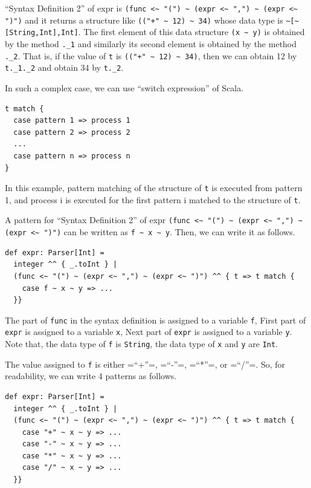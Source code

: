 \documentclass[11pt]{article}
\begin{document}
``Syntax Definition 2'' of expr is \texttt{(func <\textasciitilde{} "(") \textasciitilde{} (expr <\textasciitilde{} ",") \textasciitilde{} (expr <\textasciitilde{} ")")} 
and it returns a structure like \texttt{(("+" \textasciitilde{} 12) \textasciitilde{} 34)} whose data type is \texttt{\textasciitilde{}[\textasciitilde{}[String,Int],Int]}.
The first element of this data structure  \texttt{(x \textasciitilde{} y)} is obtained by the
method  \texttt{.\_1} and similarly its second element is obtained by the method
\texttt{.\_2}. That is, if the value of \texttt{t} is \texttt{(("+" \textasciitilde{} 12) \textasciitilde{} 34)}, 
then we can obtain 12 by  \texttt{t.\_1.\_2} and obtain 34 by \texttt{t.\_2}.

In such a complex case, we can use ``switch expression'' of Scala.
\begin{verbatim}
t match {
  case pattern 1 => process 1
  case pattern 2 => process 2
  ...
  case pattern n => process n
}
\end{verbatim}

In this example, pattern matching of the structure of \texttt{t} is executed
from pattern 1, and process i is executed for the first pattern i
matched to the structure of \texttt{t}. 

A pattern for ``Syntax Definition 2'' of expr \texttt{(func <\textasciitilde{} "(") \textasciitilde{} (expr <\textasciitilde{}
",") \textasciitilde{} (expr <\textasciitilde{} ")")} can be written as \texttt{f \textasciitilde{} x \textasciitilde{} y}. 
Then, we can write it as follows.
\begin{verbatim}
def expr: Parser[Int] =
  integer ^^ { _.toInt } |
  (func <~ "(") ~ (expr <~ ",") ~ (expr <~ ")") ^^ { t => t match {
    case f ~ x ~ y => ...
  }}
\end{verbatim}

The part of \texttt{func} in the syntax definition is assigned to a variable \texttt{f}, 
First part of \texttt{expr} is assigned to a variable \texttt{x}, 
Next part of \texttt{expr} is assigned to a variable \texttt{y}. 
Note that, the data type of \texttt{f} is \texttt{String}, the data type of \texttt{x} and
\texttt{y} are \texttt{Int}. 

The value assigned to \texttt{f} is either =``+''=, =``-''=, =``*''=, or =``/''=.
So, for readability, we can write 4 patterns as follows.
\begin{verbatim}
def expr: Parser[Int] =
  integer ^^ { _.toInt } |
  (func <~ "(") ~ (expr <~ ",") ~ (expr <~ ")") ^^ { t => t match {
    case "+" ~ x ~ y => ...
    case "-" ~ x ~ y => ...
    case "*" ~ x ~ y => ...
    case "/" ~ x ~ y => ...
  }}
\end{verbatim}
\end{document}
